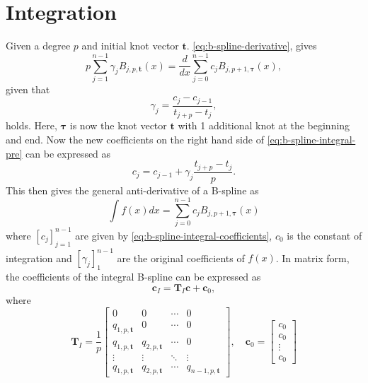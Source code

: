 \section{Integration}
Given a degree $p$ and initial knot vector $\mathbf t$. \cref{eq:b-spline-derivative}, gives
\begin{equation}\label{eq:b-spline-integral-pre}
    p \sum_{j=1}^{n-1} \gamma_j B_{j, p, \boldsymbol{t}}(x) 
    = \frac{d}{dx} \sum_{j=0}^{n-1} c_j B_{j, p+1, \boldsymbol{\tau}}(x),
\end{equation}
given that
\begin{equation}
    \gamma_j = \frac{c_j-c_{j-1}}{t_{j+p}-t_j},
\end{equation}
holds. Here, $\boldsymbol{\tau}$ is now the knot vector $\mathbf{t}$ with 1 additional knot at the beginning and end. Now
the new coefficients on the right hand side of \cref{eq:b-spline-integral-pre} can be expressed as 
\begin{equation}\label{eq:b-spline-integral-coefficients}
    c_j = c_{j-1} + \gamma_j \frac{t_{j+p}-t_j}{p}.
\end{equation}
This then gives the general anti-derivative of a B-spline as
\begin{equation}\label{eq:b-spline-integral}
    \int f(x) dx = \sum_{j=0}^{n-1} c_j B_{j, p+1, \boldsymbol{\tau}}(x)
\end{equation}
where $[c_j]_{j=1}^{n-1}$ are given by \cref{eq:b-spline-integral-coefficients}, $c_0$ is the constant of integration and $[\gamma_j]_1^{n-1}$ are the original coefficients of $f(x)$. In matrix form, the coefficients of the integral B-spline can be expressed as
\begin{equation}\label{eq:b-spline-integral-matrix}
    \mathbf{c}_I = \mathbf T_I \mathbf{c} + \mathbf{c}_0,
\end{equation}
where
\begin{equation}
    \mathbf T_I = \frac{1}{p}\begin{bmatrix}
        0 & 0 & \cdots & 0 \\
        q_{1,p,\mathbf{t}} & 0 & \cdots & 0 \\
        q_{1,p,\mathbf{t}} & q_{2,p,\mathbf{t}} & \cdots & 0 \\
        \vdots & \vdots & \ddots & \vdots \\
        q_{1,p,\mathbf{t}} & q_{2,p,\mathbf{t}} & \cdots & q_{n-1,p,\mathbf{t}}
    \end{bmatrix},\quad
    \mathbf{c}_0 = \begin{bmatrix}
        c_0 \\
        c_0 \\
        \vdots \\
        c_0
    \end{bmatrix}
\end{equation}

